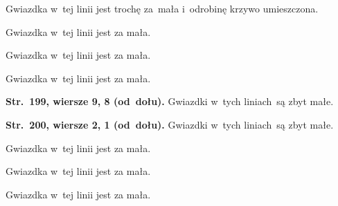 \documentclass[a4paper,11pt]{article}
\begin{document}
\vspace{\spaceFour}





\noindent
{} Gwiazdka w~tej linii jest trochę za~mała i~odrobinę krzywo
umieszczona.

\vspace{\spaceFour}





\noindent
{} Gwiazdka w~tej linii jest za mała.

\vspace{\spaceFour}





\noindent
{} Gwiazdka w~tej linii jest za mała.

\vspace{\spaceFour}





\noindent
{} Gwiazdka w~tej linii jest za mała.

\vspace{\spaceFour}





\noindent
\textbf{Str.~199, wiersze 9, 8 (od~dołu).} Gwiazdki w~tych liniach~są zbyt
małe.

\vspace{\spaceFour}





\noindent
\textbf{Str.~200, wiersze 2, 1 (od~dołu).} Gwiazdki w~tych liniach~są zbyt
małe.

\vspace{\spaceFour}





\noindent
{} Gwiazdka w~tej linii jest za mała.

\vspace{\spaceFour}





\noindent
{} Gwiazdka w~tej linii jest za mała.

\vspace{\spaceFour}





\noindent
{} Gwiazdka w~tej linii jest za mała.
\end{document}
